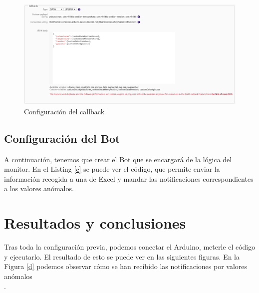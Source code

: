 \documentclass[12pt,a4paper]{article}
\begin{document}
\begin{figure}[h!]
\begin{center}
\includegraphics[width=\textwidth]{callback.png}
\caption{Configuración del callback}
\label{b}
\end{center}
\end{figure}

\subsection{Configuración del Bot}

A continuación, tenemos que crear el Bot que se encargará de la lógica del monitor. En el Listing \ref{c} se puede ver el código, que permite enviar la información recogida a una de Excel y mandar las notificaciones correspondientes a los valores anómalos.\\

\newpage
\lstset{inputencoding=utf8/latin1}
  


\section{Resultados y conclusiones}

Tras toda la configuración previa, podemos conectar el Arduino, meterle el código y ejecutarlo. El resultado de esto se puede ver en las siguientes figuras. En la Figura \ref{d} podemos observar cómo se han recibido las notificaciones por valores anómalos\\.\nocite{ref2}
\end{document}
